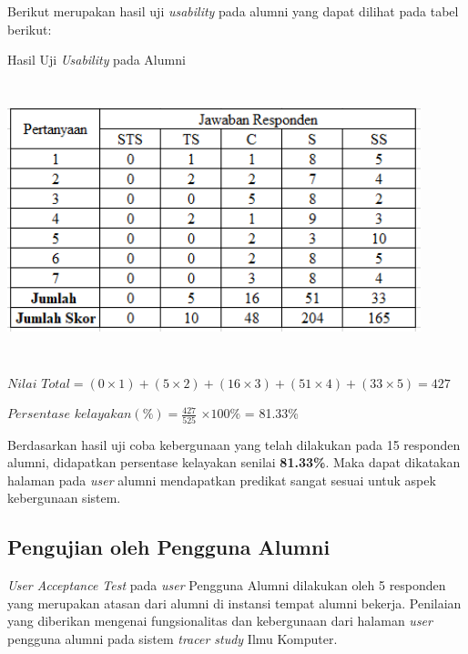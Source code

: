 \begin{enumerate}
	Berikut merupakan hasil uji \textit{usability} pada alumni yang dapat dilihat pada tabel berikut:
	
	\begin{table}[H]
		\centering
		\caption{Hasil Uji \textit{Usability} pada Alumni}
		\includegraphics[width=12cm,height=8cm]{gambar/UAT/hasil_u_alumni}
		\label{h_u_alumni}
	\end{table}
	
	$Nilai$ $Total = (0 \times 1) + (5 \times 2) + (16 \times 3) + (51 \times 4) + (33 \times 5) = 427$
		
	$Persentase$ $kelayakan (\%) = \frac{427}{525} $ $\times 100\%$ = 81.33\%
	
	Berdasarkan hasil uji coba kebergunaan yang telah dilakukan pada 15 responden alumni, didapatkan persentase kelayakan senilai \textbf{81.33\%}. Maka dapat dikatakan halaman pada \textit{user} alumni mendapatkan predikat sangat sesuai untuk aspek kebergunaan sistem.
	
\end{enumerate}

\subsection{Pengujian oleh Pengguna Alumni}
\textit{User Acceptance Test} pada \textit{user} Pengguna Alumni dilakukan oleh 5 responden yang merupakan atasan dari alumni di instansi tempat alumni bekerja. Penilaian yang diberikan mengenai fungsionalitas dan kebergunaan dari halaman \textit{user} pengguna alumni pada sistem \textit{tracer study} Ilmu Komputer.

